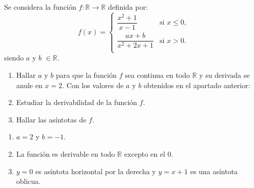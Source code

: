 {Se  considera la función $f:\mathbb{R}\to\mathbb{R}$ definida por:
\[\renewcommand{\arraystretch}{2}
f(x) = 
\begin{cases}
\dfrac{x^2  + 1}{x - 1} & \mbox{si $x \leq 0$,} \\
\dfrac{ax + b}{x^2  + 2x + 1} & \mbox{si $x>0$.} \\
\end{cases}
\]
siendo $a$ y $b$ $\in \mathbb{R}$.
\begin{enumerate}
\item Hallar $a$ y $b$ para que la función $f$ sea continua en todo $\mathbb{R}$ y su derivada se anule en $x=2$.
Con los valores de $a$ y $b$ obtenidos en el apartado anterior:
\item Estudiar la derivabilidad de la función $f$.
\item Hallar las asíntotas de $f$.
\end{enumerate}
}
{\begin{enumerate}
\item $a=2$ y $b=-1$.
\item La función es derivable en  todo $\mathbb{R}$ excepto en el 0.
\item $y=0$ es asíntota horizontal por la derecha y  $y=x+1$ es una asíntota oblicua.
\end{enumerate}
}
